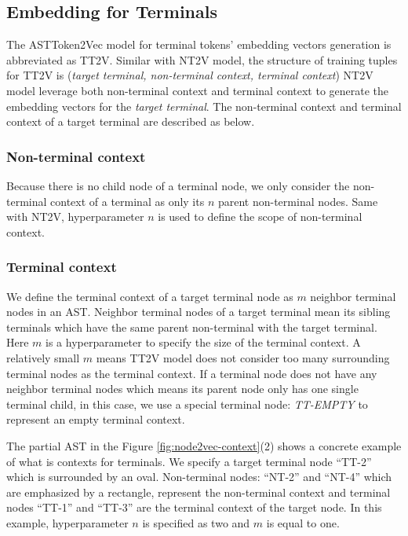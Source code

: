 \documentclass[E]{compsoft}
\begin{document}
\subsection{Embedding for Terminals}
\label{sub:embedding_tt}
The ASTToken2Vec model for terminal tokens' embedding vectors generation is abbreviated as TT2V.
Similar with NT2V model, the structure of training tuples for TT2V is (\textit{target terminal, non-terminal context, terminal context}) 
NT2V model leverage both non-terminal context and terminal context to generate the embedding vectors for the \textit{target terminal}.
The non-terminal context and terminal context of a target terminal are described as below.

\subsubsection{Non-terminal context} 
Because there is no child node of a terminal node, we only consider the non-terminal context of a terminal as only its $n$ parent non-terminal nodes. 
Same with NT2V, hyperparameter $n$ is used to define the scope of non-terminal context.

\subsubsection{Terminal context} 
We define the terminal context of a target terminal node as $m$ neighbor terminal nodes in an AST. 
Neighbor terminal nodes of a target terminal mean its sibling terminals which have the same parent non-terminal with the target terminal.
Here $m$ is a hyperparameter to specify the size of the terminal context. 
A relatively small $m$ means TT2V model does not consider too many surrounding terminal nodes as the terminal context. 
If a terminal node does not have any neighbor terminal nodes which means its parent node only has one single terminal child, in this case, we use a special terminal node: \textit{TT-EMPTY} to represent an empty terminal context. 

The partial AST in the Figure \ref{fig:node2vec-context}(2) shows a concrete example of what is contexts for terminals.
We specify a target terminal node ``TT-2'' which is surrounded by an oval. 
Non-terminal nodes: ``NT-2'' and ``NT-4'' which are emphasized by a rectangle, represent the non-terminal context and terminal nodes ``TT-1'' and ``TT-3'' are the terminal context of the target node. 
In this example, hyperparameter $n$ is specified as two and $m$ is equal to one.
\end{document}
